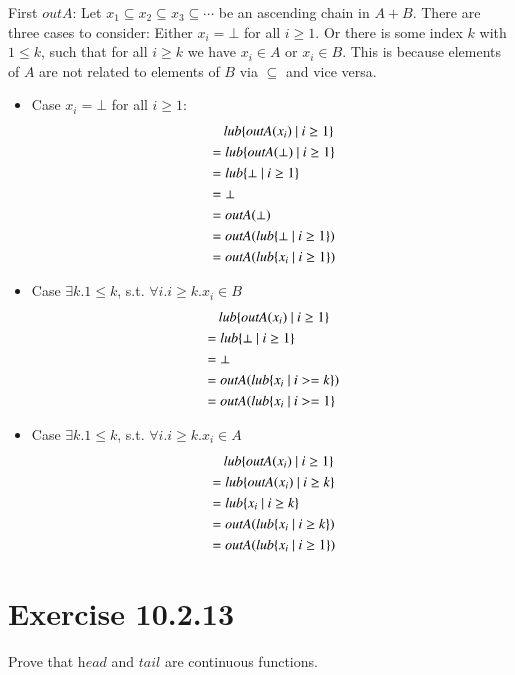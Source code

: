 \documentclass{article}[12pt]
\newcommand{\lub}{\ensuremath{\textit{}{lub}}}
\newcommand{\outA}{\ensuremath{\textit{outA}}}
\newcommand{\head}{\ensuremath{\textit{head}}}
\newcommand{\tail}{\ensuremath{\textit{tail}}}
\begin{document}
First $\outA$: Let $x_1 \subseteq x_2 \subseteq x_3 \subseteq \cdots$ be an ascending chain in $A + B$.
There are three cases to consider: Either $x_i = \bot$ for all $i \geq 1$. Or there is some index $k$ with $1 \leq k$,
such that for all $i \geq k$ we have $x_i \in A$ or $x_i \in B$. This is because elements of $A$ are not related
to elements of $B$ via $\subseteq$ and vice versa.
\begin{itemize}
    \item Case $x_i = \bot$ for all $i \geq 1$:
    \begin{align*}
        &\mathbin{\hphantom{=}} \lub\{\outA(x_i)\ |\ i \geq 1\}\\
        &= \lub\{\outA(\bot)\ |\ i \geq 1\}\\
        &= \lub\{\bot\ |\ i \geq 1\}\\
        &= \bot\\
        &= \outA(\bot)\\
        &= \outA(\lub\{\bot\ |\ i \geq 1\})\\
        &= \outA(\lub\{x_i\ |\ i \geq 1\})
    \end{align*}
    \item Case $\exists k. 1 \leq k$, s.t. $\forall i. i \geq k. x_i \in B$
    \begin{align*}
        &\mathbin{\hphantom{=}} \lub\{\outA(x_i)\ |\ i \geq 1\}\\
        &=\lub\{\bot\ |\ i \geq 1\}\\
        &=\bot\\
        &=\outA(\lub\{x_i\ |\ i >= k\})\\
        &=\outA(\lub\{x_i\ |\ i >= 1\}
    \end{align*}
    \item Case $\exists k. 1 \leq k$, s.t. $\forall i. i \geq k. x_i \in A$
    \begin{align*}
        &\mathbin{\hphantom{=}} \lub\{\outA(x_i)\ |\ i \geq 1\}\\
        &=\lub\{\outA(x_i)\ |\ i \geq k\}\\
        &=\lub\{x_i\ |\ i \geq k\}\\
        &=\outA(\lub\{x_i\ |\ i \geq k\})\\
        &=\outA(\lub\{x_i\ |\ i \geq 1\})
    \end{align*}
\end{itemize}

\section{Exercise 10.2.13}
Prove that $\head$ and $\tail$ are continuous functions.
\end{document}
